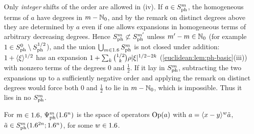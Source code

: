 Only \emph{integer} shifts of the order are allowed in (iv). If $a\in S^{m}_{\mathrm{ph}}$,
the homogeneous terms of $a$ have degrees in $m-\mathbb{N}_0$, and by the remark on
distinct degrees above they are determined by $a$ even if one allows expansions
in homogeneous terms of arbitrary decreasing degrees. Hence
$S^{m}_{\mathrm{ph}}\not\subset S^{m'}_{\mathrm{ph}}$ unless $m'-m\in\mathbb{N}_0$ (for example
$1\in S^{0}_{\mathrm{ph}}\setminus S^{1/2}_{\mathrm{ph}}$), and the union $\bigcup_{m\in1.6}S^{m}_{\mathrm{ph}}$ is
not closed under addition: $1+\langle \xi\rangle^{1/2}$ has an expansion
$1+\sum_k\binom{1/2}k\rho\lvert \xi\rvert^{1/2-2k}$ (\cref{euclidean:lem:ph-basic}(iii)) with
nonzero terms of the degrees $0$ and $\frac12$. If it lay in $S^{m}_{\mathrm{ph}}$, subtracting
the two expansions up to a sufficiently negative order and applying the remark on
distinct degrees would force both $0$ and $\frac12$ to lie in $m-\mathbb{N}_0$, which is
impossible. Thus it lies in no $S^{m}_{\mathrm{ph}}$.

\begin{definition}\label{euclidean:def:psi-ph}
  For $m\in1.6$, $\Psi^{m}_{\mathrm{ph}}(1.6^n)$ is the space of operators
  $\operatorname{Op}(a)$ with $a=\langle x-y\rangle^w\tilde a$, $\tilde a\in S^{m}_{\mathrm{ph}}(1.6^{2n};1.6^n)$, for
  some $w\in1.6$.
\end{definition}

